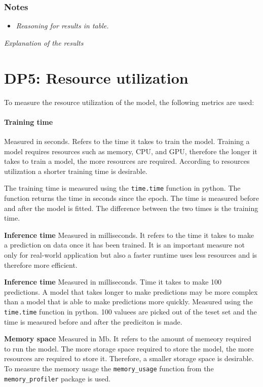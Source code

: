 \subsubsection*{Notes}
\begin{itemize}
    \item \textit{Reasoning for results in table.}
\end{itemize}

\textit{Explanation of the results}


\section{DP5: Resource utilization}\label{sec:resource-utilization}

To measure the resource utilization of the model, the following metrics are used:

\paragraph*{Training time}
Measured in seconds. Refers to the time it takes to train the model.
Training a model requires resources such as memory, CPU, and GPU, therefore the longer it takes
to train a model, the more resources are required. According to resources utilization a shorter
training time is desirable.

The training time is measured using the \texttt{time.time} function in python. The function
returns the time in seconds since the epoch. The time is measured before and after the model is
fitted. The difference between the two times is the training time.

\textbf{Inference time}
Measured in milliseconds. It refers to the time it takes to make a prediction on data once it has
been trained.
It is an important measure not only for real-world application but also a faster runtime uses
less resources and is therefore more efficient.

\textbf{Inference time}
Measured in milliseconds. Time it takes to make 100 predictions.
A model that takes longer to make predictions may be more complex than a model that is able to
make predictions more quickly.
Measured using the \texttt{time.time} function in python. 100 valuees are picked out of the teset
set and the time is measured before and after the prediciton is made.

\textbf{Memory space}
Measured in Mb.
It refers to the amount of memeory required to run the model.
The more storage space required to store the model, the more resources are required to store it.
Therefore, a smaller storage space is desirable.
To measure the memory usage the \texttt{memory\_usage} function from the \texttt{memory\_profiler}
package is used.

